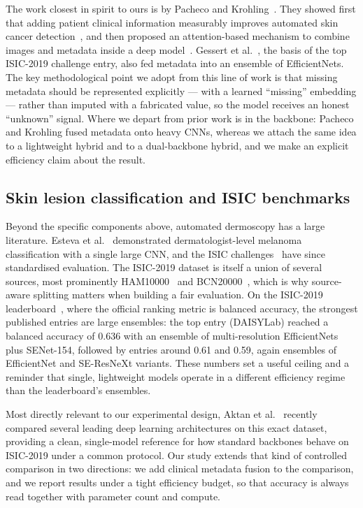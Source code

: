 The work closest in spirit to ours is by Pacheco and
Krohling~\cite{pacheco2020impact,pacheco2021attention}. They showed first that
adding patient clinical information measurably improves automated skin cancer
detection~\cite{pacheco2020impact}, and then proposed an attention-based
mechanism to combine images and metadata inside a deep
model~\cite{pacheco2021attention}. Gessert et al.~\cite{gessert2020ensembles},
the basis of the top ISIC-2019 challenge entry, also fed metadata into an
ensemble of EfficientNets. The key methodological point we adopt from this line
of work is that missing metadata should be represented explicitly --- with a
learned ``missing'' embedding --- rather than imputed with a fabricated value,
so the model receives an honest ``unknown'' signal. Where we depart from prior
work is in the backbone: Pacheco and Krohling fused metadata onto heavy CNNs,
whereas we attach the same idea to a lightweight hybrid and to a dual-backbone
hybrid, and we make an explicit efficiency claim about the result.

\subsection{Skin lesion classification and ISIC benchmarks}

Beyond the specific components above, automated dermoscopy has a large
literature. Esteva et al.~\cite{esteva2017dermatologist} demonstrated
dermatologist-level melanoma classification with a single large CNN, and the
ISIC challenges~\cite{codella2018skin} have since standardised evaluation. The
ISIC-2019 dataset is itself a union of several sources, most prominently
HAM10000~\cite{tschandl2018ham10000} and BCN20000~\cite{isic2019challenge},
which is why source-aware splitting matters when building a fair evaluation. On
the ISIC-2019 leaderboard~\cite{isic2019leaderboard}, where the official ranking
metric is balanced accuracy, the strongest published entries are large
ensembles: the top entry (DAISYLab) reached a balanced accuracy of 0.636 with an
ensemble of multi-resolution EfficientNets plus SENet-154, followed by entries
around 0.61 and 0.59, again ensembles of EfficientNet and SE-ResNeXt variants.
These numbers set a useful ceiling and a reminder that single, lightweight
models operate in a different efficiency regime than the leaderboard's
ensembles.

Most directly relevant to our experimental design, Aktan et
al.~\cite{aktan2025comparison} recently compared several leading deep learning
architectures on this exact dataset, providing a clean, single-model reference
for how standard backbones behave on ISIC-2019 under a common protocol. Our
study extends that kind of controlled comparison in two directions: we add
clinical metadata fusion to the comparison, and we report results under a tight
efficiency budget, so that accuracy is always read together with parameter count
and compute.

